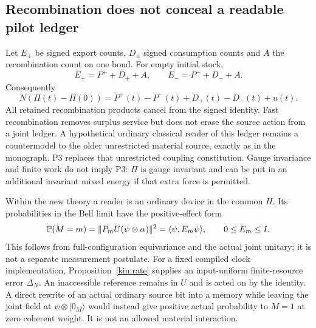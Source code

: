 \documentclass[11pt]{article}
\theoremstyle{definition}\newtheorem{definition}[theorem]{Definition}
\theoremstyle{remark}\newtheorem{remark}[theorem]{Remark}
\begin{document}
\subsection{Recombination does not conceal a readable pilot ledger}
Let $E_\pm$ be signed export counts, $D_\pm$ signed consumption counts and $A$ the recombination count on one bond. For empty initial stock,
\[
 E_+=P^++D_++A,\qquad E_-=P^-+D_-+A.
\]
Consequently
\begin{equation}
 N(\Pi(t)-\Pi(0))=P^+(t)-P^-(t)+D_+(t)-D_-(t)+u(t).
 \label{eq:ledger}
\end{equation}
All retained recombination products cancel from the signed identity. Fast recombination removes surplus service but does not erase the source action from a joint ledger. A hypothetical ordinary classical reader of this ledger remains a countermodel to the older unrestricted material source, exactly as in the monograph. P3 replaces that unrestricted coupling constitution. Gauge invariance and finite work do not imply P3: $\Pi$ is gauge invariant and can be put in an additional invariant mixed energy if that extra force is permitted.

Within the new theory a reader is an ordinary device in the common $H$. Its probabilities in the Bell limit have the positive-effect form
\begin{equation}
 \mathbb P(M=m)=\|P_mU(\psi\otimes\alpha)\|^2
       =\langle\psi,E_m\psi\rangle,\qquad 0\le E_m\le I.
 \label{eq:effect}
\end{equation}
This follows from full-configuration equivariance and the actual joint unitary; it is not a separate measurement postulate. For a fixed compiled clock implementation, Proposition~\ref{kin:rate} supplies an input-uniform finite-resource error $\Delta_N$. An inaccessible reference remains in $U$ and is acted on by the identity. A direct rewrite of an actual ordinary source bit into a memory while leaving the joint field at $\psi\otimes|0_M\rangle$ would instead give positive actual probability to $M=1$ at zero coherent weight. It is not an allowed material interaction.
\end{document}
